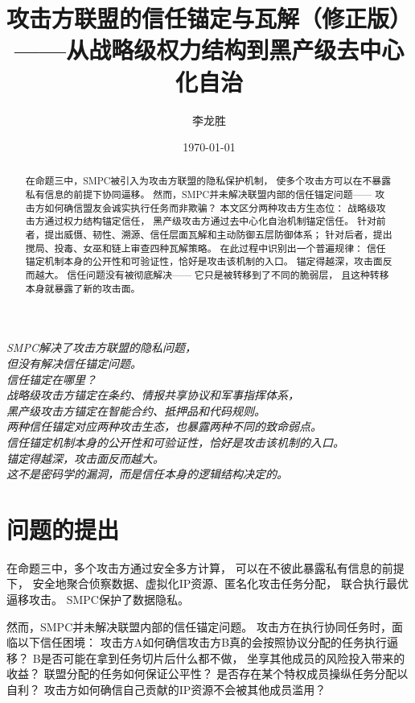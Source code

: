 \documentclass[11pt,a4paper]{article}
\title{攻击方联盟的信任锚定与瓦解（修正版）\\
——从战略级权力结构到黑产级去中心化自治}
\author{李龙胜}
\date{\today}
\begin{document}
\maketitle

\begin{center}
\textit{
SMPC解决了攻击方联盟的隐私问题，\\
但没有解决信任锚定问题。\\
信任锚定在哪里？\\
战略级攻击方锚定在条约、情报共享协议和军事指挥体系，\\
黑产级攻击方锚定在智能合约、抵押品和代码规则。\\
两种信任锚定对应两种攻击生态，也暴露两种不同的致命弱点。\\
信任锚定机制本身的公开性和可验证性，恰好是攻击该机制的入口。\\
锚定得越深，攻击面反而越大。\\
这不是密码学的漏洞，而是信任本身的逻辑结构决定的。
}
\end{center}

\vspace{5mm}

\begin{abstract}
在命题三中，SMPC被引入为攻击方联盟的隐私保护机制，
使多个攻击方可以在不暴露私有信息的前提下协同逼移。
然而，SMPC并未解决联盟内部的信任锚定问题——
攻击方如何确信盟友会诚实执行任务而非欺骗？
本文区分两种攻击方生态位：
战略级攻击方通过权力结构锚定信任，
黑产级攻击方通过去中心化自治机制锚定信任。
针对前者，提出威慑、韧性、溯源、信任层面瓦解和主动防御五层防御体系；
针对后者，提出搅局、投毒、女巫和链上审查四种瓦解策略。
在此过程中识别出一个普遍规律：
信任锚定机制本身的公开性和可验证性，恰好是攻击该机制的入口。
锚定得越深，攻击面反而越大。
信任问题没有被彻底解决——
它只是被转移到了不同的脆弱层，
且这种转移本身就暴露了新的攻击面。
\end{abstract}

\tableofcontents

\section{问题的提出}

在命题三中，多个攻击方通过安全多方计算，
可以在不彼此暴露私有信息的前提下，
安全地聚合侦察数据、虚拟化IP资源、匿名化攻击任务分配，
联合执行最优逼移攻击。
SMPC保护了数据隐私。

然而，SMPC并未解决联盟内部的信任锚定问题。
攻击方在执行协同任务时，面临以下信任困境：
攻击方A如何确信攻击方B真的会按照协议分配的任务执行逼移？
B是否可能在拿到任务切片后什么都不做，
坐享其他成员的风险投入带来的收益？
联盟分配的任务如何保证公平性？
是否存在某个特权成员操纵任务分配以自利？
攻击方如何确信自己贡献的IP资源不会被其他成员滥用？
\end{document}

